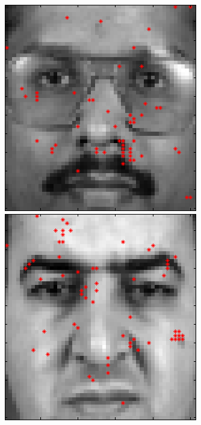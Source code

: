 \begin{figure}[ht]
 \includegraphics[width=\textwidth*11/100]{ch5/figures/XM2VTS_Full_3.png}
 \includegraphics[width=\textwidth*11/100]{ch5/figures/XM2VTS_Full_4.png}

\end{figure}
